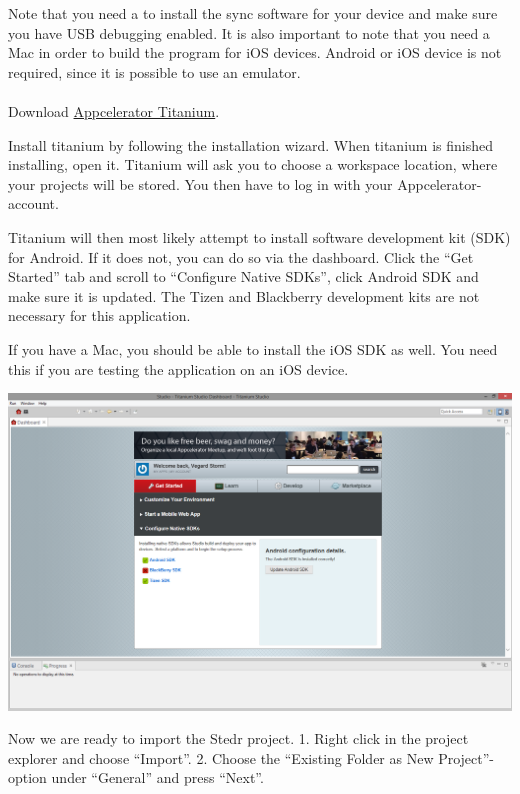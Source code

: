 Note that you need a to install the sync software for your device and make sure you have USB debugging enabled. It is also important to note that you need a Mac in order to build the program for iOS devices. Android or iOS device is not required, since it is possible to use an emulator. 

\paragraph{}

Download \href{http://www.appcelerator.com/titanium/}{Appcelerator Titanium}.

Install titanium by following the installation wizard. When titanium is finished installing, open it. Titanium will ask you to choose a workspace location, where your projects will be stored. You then have to log in with your Appcelerator-account.

Titanium will then most likely attempt to install software development kit (SDK) for Android. If it does not, you can do so via the dashboard. Click the “Get Started” tab and scroll to “Configure Native SDKs”, click Android SDK and make sure it is updated. The Tizen and Blackberry development kits are not necessary for this application.

If you have a Mac, you should be able to install the iOS SDK as well. You need this if you are testing the application on an iOS device.

\begin{center}
\includegraphics[scale=0.3]{guide/f1.png} 
\end{center}

Now we are ready to import the Stedr project.
1. Right click in the project explorer and choose “Import”.
2. Choose the “Existing Folder as New Project”-option under “General” and press “Next”.

